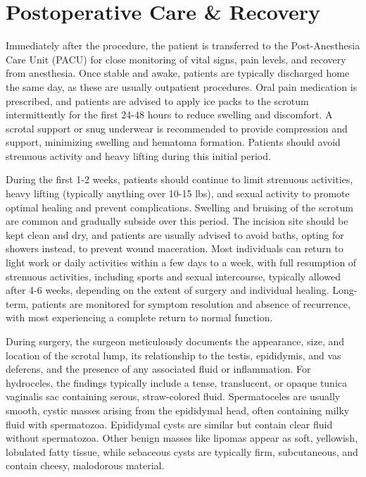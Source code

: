 \section*{Postoperative Care \& Recovery}
Immediately after the procedure, the patient is transferred to the Post-Anesthesia Care Unit (PACU) for close monitoring of vital signs, pain levels, and recovery from anesthesia. Once stable and awake, patients are typically discharged home the same day, as these are usually outpatient procedures. Oral pain medication is prescribed, and patients are advised to apply ice packs to the scrotum intermittently for the first 24-48 hours to reduce swelling and discomfort. A scrotal support or snug underwear is recommended to provide compression and support, minimizing swelling and hematoma formation. Patients should avoid strenuous activity and heavy lifting during this initial period.

During the first 1-2 weeks, patients should continue to limit strenuous activities, heavy lifting (typically anything over 10-15 lbs), and sexual activity to promote optimal healing and prevent complications. Swelling and bruising of the scrotum are common and gradually subside over this period. The incision site should be kept clean and dry, and patients are usually advised to avoid baths, opting for showers instead, to prevent wound maceration. Most individuals can return to light work or daily activities within a few days to a week, with full resumption of strenuous activities, including sports and sexual intercourse, typically allowed after 4-6 weeks, depending on the extent of surgery and individual healing. Long-term, patients are monitored for symptom resolution and absence of recurrence, with most experiencing a complete return to normal function.

During surgery, the surgeon meticulously documents the appearance, size, and location of the scrotal lump, its relationship to the testis, epididymis, and vas deferens, and the presence of any associated fluid or inflammation. For hydroceles, the findings typically include a tense, translucent, or opaque tunica vaginalis sac containing serous, straw-colored fluid. Spermatoceles are usually smooth, cystic masses arising from the epididymal head, often containing milky fluid with spermatozoa. Epididymal cysts are similar but contain clear fluid without spermatozoa. Other benign masses like lipomas appear as soft, yellowish, lobulated fatty tissue, while sebaceous cysts are typically firm, subcutaneous, and contain cheesy, malodorous material.

